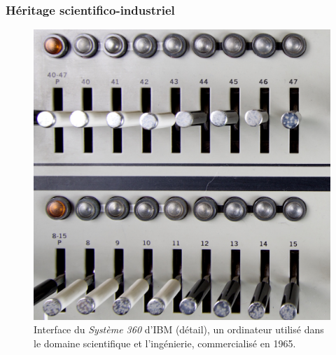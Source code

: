 \subsubsection{Héritage scientifico-industriel}
\vspace{1em}
\begin{figure}[!htbp]
	\captionsetup{format=plain}%
	\centering
	\begin{minipage}[t]{0.48\textwidth}
		\includegraphics[width=\linewidth]{gfx/05_interfaces/IBM_System_360_Panel.jpg}
		\caption[L'interface du système 360 d'IBM]{Interface du\textit{ Système 360} d'IBM (détail), un ordinateur utilisé dans le domaine scientifique et l'ingénierie, commercialisé en 1965.}
		\label{fig:interface:ibm360}
	\end{minipage}
	\hspace{.02\linewidth}
	\begin{minipage}[t]{0.48\textwidth}

\end{minipage}
\end{figure}
